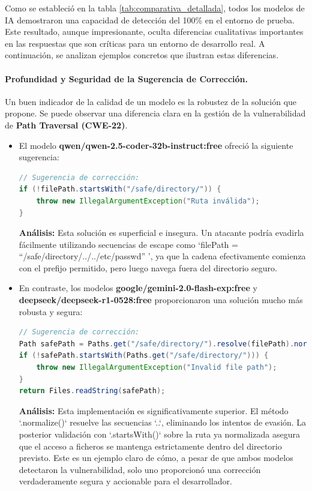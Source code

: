 Como se estableció en la tabla \ref{tab:comparativa_detallada}, todos los modelos de IA demostraron una capacidad de detección del 100\% en el entorno de prueba. Este resultado, aunque impresionante, oculta diferencias cualitativas importantes en las respuestas que son críticas para un entorno de desarrollo real. A continuación, se analizan ejemplos concretos que ilustran estas diferencias.

\paragraph{Profundidad y Seguridad de la Sugerencia de Corrección.}
Un buen indicador de la calidad de un modelo es la robustez de la solución que propone. Se puede observar una diferencia clara en la gestión de la vulnerabilidad de \textbf{Path Traversal (CWE-22)}.


\begin{itemize}
    \item El modelo \textbf{qwen/qwen-2.5-coder-32b-instruct:free} ofreció la siguiente sugerencia:
    \begin{lstlisting}[language=java,caption={Sugerencia de Qwen para Path Traversal.}]
// Sugerencia de corrección:
if (!filePath.startsWith("/safe/directory/")) {
    throw new IllegalArgumentException("Ruta inválida");
}
    \end{lstlisting}
    \textbf{Análisis:} Esta solución es superficial e insegura. Un atacante podría evadirla fácilmente utilizando secuencias de escape como `filePath = ``/safe/directory/../../etc/passwd'' ', ya que la cadena efectivamente comienza con el prefijo permitido, pero luego navega fuera del directorio seguro.

    \item En contraste, los modelos \textbf{google/gemini-2.0-flash-exp:free} y \textbf{deepseek/deepseek-r1-0528:free} proporcionaron una solución mucho más robusta y segura:
    \begin{lstlisting}[language=java,caption={Sugerencia de Gemini/DeepSeek para Path Traversal.}]
// Sugerencia de corrección:
Path safePath = Paths.get("/safe/directory/").resolve(filePath).normalize();
if (!safePath.startsWith(Paths.get("/safe/directory/"))) {
    throw new IllegalArgumentException("Invalid file path");
}
return Files.readString(safePath);
    \end{lstlisting}
    \textbf{Análisis:} Esta implementación es significativamente superior. El método `.normalize()` resuelve las secuencias `..`, eliminando los intentos de evasión. La posterior validación con `.startsWith()` sobre la ruta ya normalizada asegura que el acceso a ficheros se mantenga estrictamente dentro del directorio previsto. Este es un ejemplo claro de cómo, a pesar de que ambos modelos detectaron la vulnerabilidad, solo uno proporcionó una corrección verdaderamente segura y accionable para el desarrollador.
\end{itemize}

